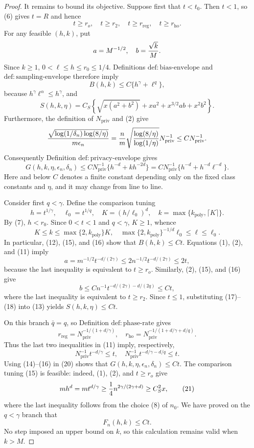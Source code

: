 \documentclass{article}
\begin{document}
\begin{proof}
It remains to bound its objective.  Suppose first that \(t<t_0\).  Then \(t<1\), so (6) gives \(t=R\) and hence
\[
 t\ge r_o,\quad t\ge r_2,
 \quad t\ge r_{\mathrm{reg}},\quad t\ge r_{\mathrm{ho}}.
\tag{11}
\]
For any feasible \((h,k)\), put
\[
 a=M^{-1/2},\quad b={\sqrt{k}\over M}.
\]
Since \(k\ge1\), \(0<\ell\le h\le r_0\le1/4\).  Definitions \(\mathrm{def{:}bias\text{-}envelope}\) and \(\mathrm{def{:}sampling\text{-}envelope}\) therefore imply
\[
 B(h,k)\le C\{h^\gamma+\ell^q\},
\tag{12}
\]
because \(h^\gamma\ell^\alpha\le h^\gamma\), and
\[
 S(h,k,\eta)=C_S\left\{
 \sqrt{x(a^2+b^2)}+xa^2+x^{3/2}ab+x^2b^2
 \right\}.
\tag{13}
\]
Furthermore, the definition of \(N_{\mathrm{priv}}\) and (2) give
\[
 {\sqrt{\log(1/\delta_n)\log(8/\eta)}\over m\epsilon_n}
 ={n\over m}\sqrt{{\log(8/\eta)\over\log(1/\eta)}}
 N_{\mathrm{priv}}^{-1}
 \le C N_{\mathrm{priv}}^{-1}.
\]
Consequently Definition \(\mathrm{def{:}privacy\text{-}envelope}\) gives
\[
 G(h,k,\eta,\epsilon_n,\delta_n)
 \le C N_{\mathrm{priv}}^{-1}\{h^{-d}+kh^{-2d}\}
 =C N_{\mathrm{priv}}^{-1}\{h^{-d}+h^{-d}\ell^{-d}\}.
\tag{14}
\]
Here and below \(C\) denotes a finite constant depending only on the fixed class constants and \(\eta\), and it may change from line to line.

Consider first \(q<\gamma\).  Define the comparison tuning
\[
 h=t^{1/\gamma},\quad \ell_0=t^{1/q},
 \quad K=(h/\ell_0)^d,\quad
 k=\max\{k_{\mathrm{poly}},\lceil K\rceil\}.
\tag{15}
\]
By (7), \(h<r_0\).  Since \(0<t<1\) and \(q<\gamma\), \(K\ge1\), whence
\[
 K\le k\le \max\{2,k_{\mathrm{poly}}\}K,
 \quad
 \max\{2,k_{\mathrm{poly}}\}^{-1/d}\ell_0
 \le \ell\le\ell_0.
\tag{16}
\]
In particular, (12), (15), and (16) show that \(B(h,k)\le Ct\).  Equations (1), (2), and (11) imply
\[
 a=m^{-1/2}t^{-d/(2\gamma)}
 \le2n^{-1/2}t^{-d/(2\gamma)}
 \le2t,
\tag{17}
\]
because the last inequality is equivalent to \(t\ge r_o\).  Similarly, (2), (15), and (16) give
\[
 b\le Cn^{-1}t^{-d/(2\gamma)-d/(2q)}\le Ct,
\tag{18}
\]
where the last inequality is equivalent to \(t\ge r_2\).  Since \(t\le1\), substituting (17)--(18) into (13) yields \(S(h,k,\eta)\le Ct\).

On this branch \(\bar q=q\), so Definition \(\mathrm{def{:}phase\text{-}rate}\) gives
\[
 r_{\mathrm{reg}}=N_{\mathrm{priv}}^{-1/(1+d/\gamma)},
 \quad
 r_{\mathrm{ho}}=N_{\mathrm{priv}}^{-1/(1+d/\gamma+d/q)}.
\tag{19}
\]
Thus the last two inequalities in (11) imply, respectively,
\[
 N_{\mathrm{priv}}^{-1}t^{-d/\gamma}\le t,
 \quad
 N_{\mathrm{priv}}^{-1}t^{-d/\gamma-d/q}\le t.
\tag{20}
\]
Using (14)--(16) in (20) shows that \(G(h,k,\eta,\epsilon_n,\delta_n)\le Ct\).  The comparison tuning (15) is feasible: indeed, (1), (2), and \(t\ge r_o\) give
\[
 mh^d=mt^{d/\gamma}
 \ge {1\over4}n^{2\gamma/(2\gamma+d)}
 \ge C_S^2x,
\tag{21}
\]
where the last inequality follows from the choice (8) of \(n_0\).  We have proved on the \(q<\gamma\) branch that
\[
 F_n(h,k)\le Ct.
\tag{22}
\]
No step imposed an upper bound on \(k\), so this calculation remains valid when \(k>M\).


\end{proof}
\end{document}

